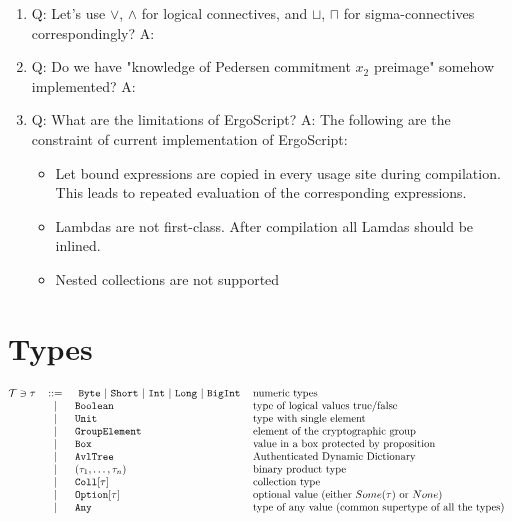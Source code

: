 \documentclass[11pt]{article}
\newcommand{\langname}{ErgoScript\xspace}
\newcommand{\lst}[1]{\text{\lstinline[basicstyle={\ttfamily}]$#1$}}
\begin{document}
{\begin{enumerate}
  \item Q: Let's use $\lor$, $\land$ for logical connectives, and $\sqcup$, $\sqcap$ for
           sigma-connectives correspondingly? \linebreak
        A:
  \item Q: Do we have "knowledge of Pedersen commitment $x_2$ preimage" somehow implemented? \linebreak
        A:
  \item Q: What are the limitations of \langname? \linebreak
        A: The following are the constraint of current implementation of \langname:
        \begin{itemize}
          \item Let bound expressions are copied in every usage site during compilation. This leads to repeated evaluation of the corresponding expressions.
          \item Lambdas are not first-class. After compilation all Lamdas should be inlined.
          \item Nested collections are not supported
        \end{itemize}
\end{enumerate}

\section{Types}

\[\begin{tabular}{@{}l c l l}
      $\mathcal{T} \ni \tau$			& ::= 	    &\
         \lst{Byte} $\mid$ \lst{Short} $\mid$
         \lst{Int} $\mid$ \lst{Long} $\mid$ \lst{BigInt}  & numeric types     \\
      &	$\mid$	& \lst{Boolean} 			& type of logical values true/false   \\
      &	$\mid$	& \lst{Unit} 				& type with single element   \\
      &	$\mid$	& \lst{GroupElement} 		& element of the cryptographic group  \\
      &	$\mid$	& \lst{Box} 				& value in a box protected by proposition  \\
      &	$\mid$	& \lst{AvlTree} 			&  Authenticated Dynamic Dictionary \\
      &	$\mid$	& $(\tau_1, \dots, \tau_n) $	& binary product type  \\
      & $\mid$  & $\text{\lst{Coll}}[\tau]$	& collection type       \\
      & $\mid$  & $\text{\lst{Option}}[\tau]$	& optional value (either $Some(\tau)$ or $None$)      \\
      & $\mid$  & \lst{Any}                     & type of any value (common supertype of all the types) \\
\end{tabular}\]

}
\end{document}
